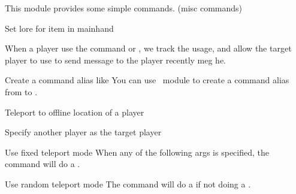 
This module provides some simple commands.
(misc commands)


\begin{example}{Set lore for item in mainhand}
\end{example}

When a player use the command  or , we track the usage, and allow the target player to use  to send message to the player recently meg he.

\begin{tips}{Create a command alias like }
    You can use~ module to create a command alias from  to .
\end{tips}



\begin{example}{Teleport to offline location of a player}
\end{example}

\begin{example}{Specify another player as the target player}
\end{example}

\begin{example}{Use fixed teleport mode}
    When any of the following args is specified, the  command will do a .\\
\end{example}

\begin{example}{Use random teleport mode}
    The  command will do a  if not doing a .\\
\end{example}

